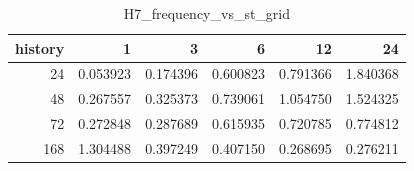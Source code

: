 \begin{table}
\caption{H7_frequency_vs_st_grid}
\label{tab:H7_frequency_vs_st_grid}
\begin{tabular}{rrrrrr}
\toprule
history & 1 & 3 & 6 & 12 & 24 \\
\midrule
24 & 0.053923 & 0.174396 & 0.600823 & 0.791366 & 1.840368 \\
48 & 0.267557 & 0.325373 & 0.739061 & 1.054750 & 1.524325 \\
72 & 0.272848 & 0.287689 & 0.615935 & 0.720785 & 0.774812 \\
168 & 1.304488 & 0.397249 & 0.407150 & 0.268695 & 0.276211 \\
\bottomrule
\end{tabular}
\end{table}
